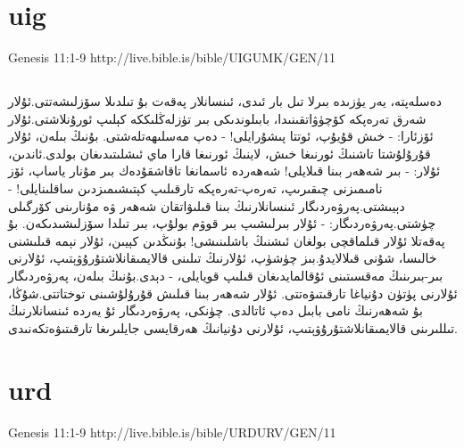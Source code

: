 \documentclass[12pt,fleqn,titlepage,twoside,a4paper]{book}
\begin{document}
\section{uig}

Genesis 11:1-9 http://live.bible.is/bible/UIGUMK/GEN/11

\begin{arab}[utf]
\section*{}

دەسلەپتە، يەر يۈزىدە بىرلا تىل بار ئىدى، ئىنسانلار پەقەت بۇ تىلدىلا سۆزلىشەتتى.ئۇلار شەرق تەرەپكە كۆچۈۋاتقىنىدا، بابىلوندىكى بىر تۈزلەڭلىككە كېلىپ ئورۇنلاشتى.ئۇلار ئۆزئارا: - خىش قۇيۇپ، ئوتتا پىشۇرايلى! - دەپ مەسلىھەتلەشتى. بۇنىڭ بىلەن، ئۇلار قۇرۇلۇشتا تاشنىڭ ئورنىغا خىش، لاينىڭ ئورنىغا قارا ماي ئىشلىتىدىغان بولدى.ئاندىن، ئۇلار: - بىر شەھەر بىنا قىلايلى! شەھەردە ئاسمانغا تاقاشقۇدەك بىر مۇنار ياساپ، ئۆز نامىمىزنى چىقىرىپ، تەرەپ-تەرەپكە تارقىلىپ كېتىشىمىزدىن ساقلىنايلى! - دېيىشتى.پەرۋەردىگار ئىنسانلارنىڭ بىنا قىلىۋاتقان شەھەر ۋە مۇنارىنى كۆرگىلى چۈشتى.پەرۋەردىگار: - ئۇلار بىرلىشىپ بىر قوۋم بولۇپ، بىر تىلدا سۆزلىشىدىكەن. بۇ پەقەتلا ئۇلار قىلماقچى بولغان ئىشنىڭ باشلىنىشى! بۇنىڭدىن كېيىن، ئۇلار نېمە قىلىشنى خالىسا، شۇنى قىلالايدۇ.بىز چۈشۈپ، ئۇلارنىڭ تىلىنى قالايمىقانلاشتۇرۇۋېتىپ، ئۇلارنى بىر-بىرىنىڭ مەقسىتىنى ئۇقالمايدىغان قىلىپ قويايلى، - دېدى.بۇنىڭ بىلەن، پەرۋەردىگار ئۇلارنى پۈتۈن دۇنياغا تارقىتىۋەتتى. ئۇلار شەھەر بىنا قىلىش قۇرۇلۇشىنى توختاتتى.شۇڭا، بۇ شەھەرنىڭ نامى بابىل دەپ ئاتالدى. چۈنكى، پەرۋەردىگار ئۇ يەردە ئىنسانلارنىڭ تىللىرىنى قالايمىقانلاشتۇرۇۋېتىپ، ئۇلارنى دۇنيانىڭ ھەرقايسى جايلىرىغا تارقىتىۋەتكەنىدى.

\end{arab}


\section{urd}

Genesis 11:1-9 http://live.bible.is/bible/URDURV/GEN/11
\end{document}
